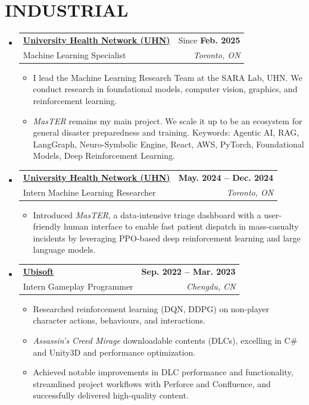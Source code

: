 \documentclass[letterpaper,11pt]{article}
\makeatletter
\newcommand{\resumeItem}[1]{
  \item\small{
    {#1 \vspace{-2pt}}
  }
}
\newcommand{\resumeSubheading}[4]{
  \vspace{-2pt}\item
    \begin{tabular*}{1.0\textwidth}[t]{l@{\extracolsep{\fill}}r}
      \textbf{\small{#1}} & {#2} \\
      {#3} & \textit{\small #4} \\
    \end{tabular*}\vspace{-7pt}
}
\newcommand{\resumeSubHeadingListStart}{\begin{itemize}[leftmargin=0.0in, label={}]}
\newcommand{\resumeSubHeadingListEnd}{\end{itemize}}
\newcommand{\resumeItemListStart}{\begin{itemize}}
\newcommand{\resumeItemListEnd}{\end{itemize}\vspace{-5pt}}
\makeatother
\begin{document}
\section{INDUSTRIAL}
  \resumeSubHeadingListStart
    \resumeSubheading
      {\href{https://temertysimcentre.com/surgical-artificial-intelligence-research-academy-sara/}{University Health Network (UHN)}}{Since \textbf{Feb. 2025}}
      {Machine Learning Specialist}{Toronto, ON}
      \resumeItemListStart
        \resumeItem{I lead the Machine Learning Research Team at the SARA Lab, UHN. We conduct research in foundational models, computer vision, graphics, and reinforcement learning.}
        \resumeItem{\textit{MasTER} remains my main project. We scale it up to be an ecosystem for general disaster preparedness and training. Keywords: Agentic AI, RAG, LangGraph, Neuro-Symbolic Engine, React, AWS, PyTorch, Foundational Models, Deep Reinforcement Learning. }

      \resumeItemListEnd
    \resumeSubheading
      {\href{https://temertysimcentre.com/surgical-artificial-intelligence-research-academy-sara/}{University Health Network (UHN)}}{\textbf{May. 2024 -- Dec. 2024}}
      {Intern Machine Learning Researcher}{Toronto, ON}
      \resumeItemListStart
        \resumeItem{Introduced \textit{MasTER}, a data-intensive triage dashboard with a user-friendly human interface to enable fast patient dispatch in mass-casualty incidents by leveraging PPO-based deep reinforcement learning and large language models.}
      \resumeItemListEnd
    \resumeSubheading
      {\href{https://www.ubisoft.com/}{Ubisoft}}{\textbf{Sep. 2022 -- Mar. 2023}}
      {Intern Gameplay Programmer}{Chengdu, CN}
      \resumeItemListStart
        \resumeItem{Researched reinforcement learning (DQN, DDPG) on non-player character actions, behaviours, and interactions. }
        \resumeItem{\textit{Assassin's Creed Mirage} downloadable contents (DLCs), excelling in C\# and Unity3D and performance optimization. }
        \resumeItem{Achieved notable improvements in DLC performance and functionality, streamlined project workflows with Perforce and Confluence, and successfully delivered high-quality content. }
      \resumeItemListEnd
  \resumeSubHeadingListEnd

\vspace{-5pt}
\end{document}
